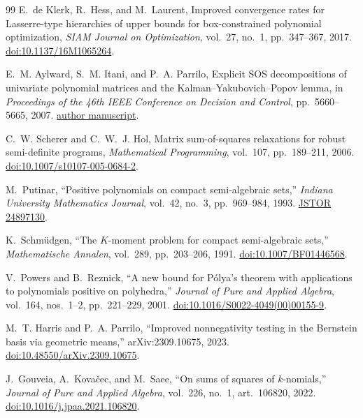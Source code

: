 \documentclass[11pt]{report}
\begin{document}
\begin{thebibliography}{99}
E.~de Klerk, R.~Hess, and M.~Laurent, Improved convergence rates for Lasserre-type hierarchies of upper bounds for box-constrained polynomial optimization, \emph{SIAM Journal on Optimization}, vol.~27, no.~1, pp.~347--367, 2017. \href{https://doi.org/10.1137/16M1065264} {doi:10.1137/16M1065264}.

E.~M. Aylward, S.~M. Itani, and P.~A. Parrilo, Explicit SOS decompositions of univariate polynomial matrices and the Kalman--Yakubovich--Popov lemma, in \emph{Proceedings of the 46th IEEE Conference on Decision and Control}, pp.~5660--5665, 2007. \href{https://www.mit.edu/~parrilo/pubs/files/AylwardItaniParrilo-ExplicitSOSDecompositionsOfUnivariatePolynomialMatricesAndTheKYPLemma.pdf} {author manuscript}.

C.~W. Scherer and C.~W.~J. Hol, Matrix sum-of-squares relaxations for robust semi-definite programs, \emph{Mathematical Programming}, vol.~107, pp.~189--211, 2006. \href{https://doi.org/10.1007/s10107-005-0684-2} {doi:10.1007/s10107-005-0684-2}.

M.~Putinar, ``Positive polynomials on compact semi-algebraic sets,'' \emph{Indiana University Mathematics Journal}, vol.~42, no.~3, pp.~969--984, 1993. \href{https://www.jstor.org/stable/24897130}{JSTOR 24897130}.

K.~Schm\"udgen, ``The $K$-moment problem for compact semi-algebraic sets,'' \emph{Mathematische Annalen}, vol.~289, pp.~203--206, 1991. \href{https://doi.org/10.1007/BF01446568} {doi:10.1007/BF01446568}.

V.~Powers and B.~Reznick, ``A new bound for P\'olya's theorem with applications to polynomials positive on polyhedra,'' \emph{Journal of Pure and Applied Algebra}, vol.~164, nos.~1--2, pp.~221--229, 2001. \href{https://doi.org/10.1016/S0022-4049(00)00155-9} {doi:10.1016/S0022-4049(00)00155-9}.

M.~T. Harris and P.~A. Parrilo, ``Improved nonnegativity testing in the Bernstein basis via geometric means,'' arXiv:2309.10675, 2023. \href{https://doi.org/10.48550/arXiv.2309.10675}{doi:10.48550/arXiv.2309.10675}.

J.~Gouveia, A.~Kova\v{c}ec, and M.~Saee, ``On sums of squares of $k$-nomials,'' \emph{Journal of Pure and Applied Algebra}, vol.~226, no.~1, art.~106820, 2022. \href{https://doi.org/10.1016/j.jpaa.2021.106820}{doi:10.1016/j.jpaa.2021.106820}.


\end{thebibliography}
\end{document}
